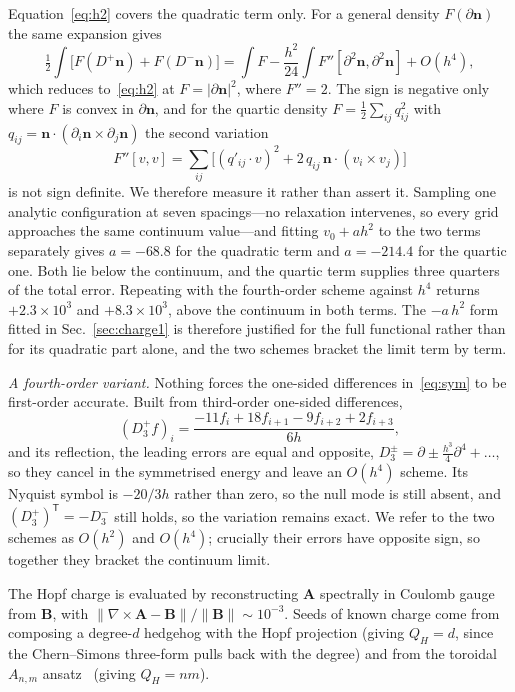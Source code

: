 \documentclass[aps,prd,preprint,nofootinbib,longbibliography]{revtex4-2}
\newcommand{\nv}{\bm{n}}
\newcommand{\Av}{\bm{A}}
\newcommand{\Bv}{\bm{B}}
\newcommand{\Qh}{Q_H}
\begin{document}
Equation~\eqref{eq:h2} covers the quadratic term only. For a general density
$F(\partial\nv)$ the same expansion gives
\begin{equation}
\tfrac12\!\int\!\big[F(D^+\nv)+F(D^-\nv)\big]
 = \int\! F - \frac{h^2}{24}\int\! F''[\partial^2\nv,\partial^2\nv] + O(h^4),
\label{eq:h2gen}
\end{equation}
which reduces to~\eqref{eq:h2} at $F=|\partial\nv|^2$, where $F''=2$. The sign is
negative only where $F$ is convex in $\partial\nv$, and for the quartic density
$F=\tfrac12\sum_{ij}q_{ij}^2$ with
$q_{ij}=\nv\cdot(\partial_i\nv\times\partial_j\nv)$ the second variation
\begin{equation}
F''[v,v]=\sum_{ij}\big[(q'_{ij}\!\cdot\!v)^2
 +2\,q_{ij}\,\nv\cdot(v_i\times v_j)\big]
\end{equation}
is not sign definite. We therefore measure it rather than assert it. Sampling one
analytic configuration at seven spacings---no relaxation intervenes, so every
grid approaches the same continuum value---and fitting $v_0+ah^2$ to the two
terms separately gives $a=-68.8$ for the quadratic term and $a=-214.4$ for the
quartic one. Both lie below the continuum, and the quartic term supplies three
quarters of the total error. Repeating with the fourth-order scheme against $h^4$
returns $+2.3\times10^3$ and $+8.3\times10^3$, above the continuum in both terms.
The $-a\,h^2$ form fitted in Sec.~\ref{sec:charge1} is therefore justified for the
full functional rather than for its quadratic part alone, and the two schemes
bracket the limit term by term.

\emph{A fourth-order variant.} Nothing forces the one-sided differences
in~\eqref{eq:sym} to be first-order accurate. Built from third-order one-sided
differences,
\begin{equation}
(D^+_3f)_i=\frac{-11f_i+18f_{i+1}-9f_{i+2}+2f_{i+3}}{6h},
\end{equation}
and its reflection, the leading errors are equal and opposite,
$D^\pm_3=\partial\pm\tfrac{h^3}{4}\partial^4+\ldots$, so they cancel in the
symmetrised energy and leave an $O(h^4)$ scheme. Its Nyquist symbol is $-20/3h$
rather than zero, so the null mode is still absent, and
$(D^+_3)^{\mathsf T}=-D^-_3$ still holds, so the variation remains exact. We
refer to the two schemes as $O(h^2)$ and $O(h^4)$; crucially their errors have
opposite sign, so together they bracket the continuum limit.

The Hopf charge is evaluated by reconstructing $\Av$ spectrally in Coulomb gauge
from $\Bv$, with $\|\nabla\times\Av-\Bv\|/\|\Bv\|\sim10^{-3}$. Seeds of known charge
come from composing a degree-$d$ hedgehog with the Hopf projection (giving
$\Qh=d$, since the Chern--Simons three-form pulls back with the degree) and from
the toroidal $A_{n,m}$ ansatz~\cite{gladikowski1997,hietarinta1999} (giving
$\Qh=nm$).
\end{document}
